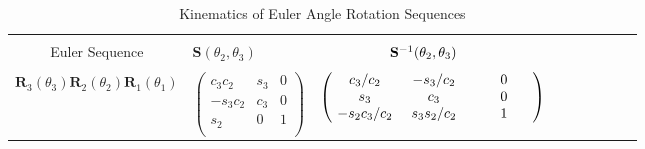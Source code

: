 \begin{table}[h]
        \centering
        \caption{Kinematics of Euler Angle Rotation Sequences}
        \begin{tabular}{cllcccccc}  \hline \hline \\
        Euler Sequence & \hspace{0.2 in} $\mathbf{S}(\theta_2,\theta_3)$ &
        $\hspace{0.7 in} \mathbf{S}^{-1}(\theta_2,\theta_3)$\\
        \hline
        \\
    \footnotesize
        $\mathbf{R}_3(\theta_3)\mathbf{R}_2(\theta_2)\mathbf{R}_1(\theta_1)$
        &
        \footnotesize
        $\begin{pmatrix}
             c_3 c_2  &  s_3  &  0  \\
            -s_3 c_2  &  c_3  &  0  \\
               s_2    &   0   &  1  \\
        \end{pmatrix}$
        &
        \footnotesize
        $\begin{pmatrix}
            \hspace{0.05 in}    c_3 / c_2     &  \hspace{0.05 in}  -s_3 / c_2     &  \hspace{0.3 in}  0  \hspace{0.25 in} \\
            \hspace{0.05 in}       s_3        &  \hspace{0.05 in}      c_3        &  \hspace{0.3 in}  0  \hspace{0.25 in} \\
            \hspace{0.05 in}  -s_2 c_3 / c_2  &  \hspace{0.05 in}  s_3 s_2 / c_2  &  \hspace{0.3 in}  1  \hspace{0.25 in} \\
        \end{pmatrix}  \vspace{.1 in}$\\

\end{tabular}
\end{table}
